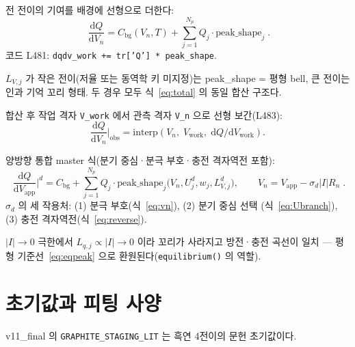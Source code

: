 \documentclass[11pt,a4paper]{article}
\newcommand{\dd}{\mathrm{d}}
\newcommand{\app}{\mathrm{app}}
\newcommand{\bg}{\mathrm{bg}}
\begin{document}
전 전이의 기여를 배경에 선형으로 더한다:
\begin{equation}
\boxed{\;\frac{\dd Q}{\dd V_n}
= C_\bg(V_n,T)
+ \sum_{j=1}^{N_p} Q_j \cdot \text{peak\_shape}_j\;.}
\label{eq:total}
\end{equation}
코드 L481: \texttt{dqdv\_work += tr['Q'] * peak\_shape}.

$L_{V,j}$ 가 작은 전이(저율 또는 동역학 키 미지정)는 peak\_shape = 평형 bell, 큰
전이는 인과 기억 꼬리 형태. 두 경우 모두 식~\eqref{eq:total} 의 동일 합산 구조다.

합산 후 작업 격자 \texttt{V\_work} 에서 관측 격자 \texttt{V\_n} 으로 선형 보간(L483):
\begin{equation}
\frac{\dd Q}{\dd V_n}\bigg|_\text{obs} = \mathrm{interp}(V_n,\; V_\text{work},\; \dd Q/\dd V_\text{work}).
\label{eq:interp}
\end{equation}

양방향 통합 master 식(분기 중심·분극 부호·충전 격자역전 포함):
\begin{equation}
\boxed{\;\frac{\dd Q}{\dd V_\app}\bigg|^d
= C_\bg + \sum_{j=1}^{N_p} Q_j \cdot \text{peak\_shape}_j\bigl(V_n, U_j^d, w_j, L_{V,j}^d\bigr),
\qquad V_n = V_\app - \sigma_d|I|R_n\;.}
\label{eq:master}
\end{equation}
$\sigma_d$ 의 세 작용처: (1) 분극 부호(식~\eqref{eq:vn}), (2) 분기 중심 선택
(식~\eqref{eq:Ubranch}), (3) 충전 격자역전(식~\eqref{eq:reverse}).

$|I|\to0$ 극한에서 $L_{q,j}\propto|I|\to0$ 이라 꼬리가 사라지고 방전·충전 곡선이
일치 — 평형 기준선~\eqref{eq:eqpeak} 으로 환원된다(\texttt{equilibrium()} 의 역할).

\section{초기값과 피팅 사양}\label{sec:fitting}

v11\_final 의 \texttt{GRAPHITE\_STAGING\_LIT} 는 흑연 4전이의 문헌 초기값이다.
\end{document}
